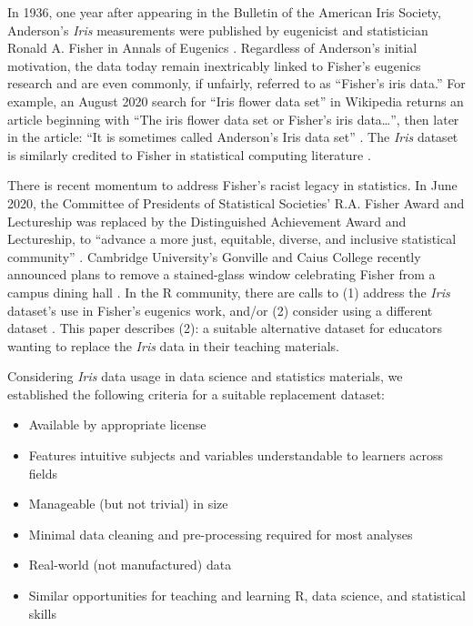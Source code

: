 In 1936, one year after appearing in the Bulletin of the American Iris
Society, Anderson's \emph{Iris} measurements were published by
eugenicist and statistician Ronald A. Fisher in Annals of Eugenics
\citep{fisher_use_1936}. Regardless of Anderson's initial motivation,
the data today remain inextricably linked to Fisher's eugenics research
and are even commonly, if unfairly, referred to as ``Fisher's iris
data.'' For example, an August 2020 search for ``Iris flower data set''
in Wikipedia returns an article beginning with ``The iris flower data
set or Fisher's iris data\ldots{}'', then later in the article: ``It is
sometimes called Anderson's Iris data set'' \citep{wikipedia_iris_2020}.
The \emph{Iris} dataset is similarly credited to Fisher in statistical
computing literature \citep[\citet{wang_matlab_2015},
\citet{woods_how_2015},
\citet{chen_unsupervised_2018}]{trendafilov_simple_2009}.

There is recent momentum to address Fisher's racist legacy in
statistics. In June 2020, the Committee of Presidents of Statistical
Societies' R.A. Fisher Award and Lectureship was replaced by the
Distinguished Achievement Award and Lectureship, to ``advance a more
just, equitable, diverse, and inclusive statistical community''
\citep{noauthor_institute_2020}. Cambridge University's Gonville and
Caius College recently announced plans to remove a stained-glass window
celebrating Fisher from a campus dining hall \citep{noauthor_sir_2020}.
In the R community, there are calls to (1) address the \emph{Iris}
dataset's use in Fisher's eugenics work, and/or (2) consider using a
different dataset
\citep[\citet{garrick_aden-buie_lets_2020}]{poisot_timothee_its_2020}.
This paper describes (2): a suitable alternative dataset for educators
wanting to replace the \emph{Iris} data in their teaching materials.

Considering \emph{Iris} data usage in data science and statistics
materials, we established the following criteria for a suitable
replacement dataset:

\begin{itemize}
\tightlist
\item
  Available by appropriate license
\item
  Features intuitive subjects and variables understandable to learners
  across fields
\item
  Manageable (but not trivial) in size
\item
  Minimal data cleaning and pre-processing required for most analyses
\item
  Real-world (not manufactured) data
\item
  Similar opportunities for teaching and learning R, data science, and
  statistical skills
\end{itemize}

